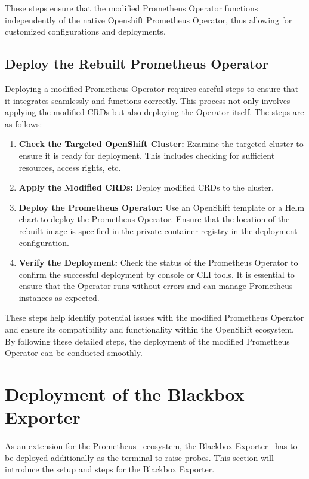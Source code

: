 These steps ensure that the modified Prometheus Operator functions independently of the native Openshift Prometheus Operator, thus allowing for customized configurations and deployments. 

\subsection{Deploy the Rebuilt Prometheus Operator}

Deploying a modified Prometheus Operator requires careful steps to ensure that it integrates seamlessly and functions correctly. This process not only involves applying the modified \ac{CRD}s but also deploying the Operator itself. The steps are as follows: 

\begin{enumerate}
    \item \textbf{Check the Targeted OpenShift Cluster:} Examine the targeted cluster to ensure it is ready for deployment. This includes checking for sufficient resources, access rights, etc. 
    \item \textbf{Apply the Modified CRDs:} Deploy modified CRDs to the cluster. 
    \item \textbf{Deploy the Prometheus Operator:} Use an OpenShift template or a Helm chart to deploy the Prometheus Operator. Ensure that the location of the rebuilt image is specified in the private container registry in the deployment configuration. 
    \item \textbf{Verify the Deployment:} Check the status of the Prometheus Operator to confirm the successful deployment by console or \ac{CLI} tools. It is essential to ensure that the Operator runs without errors and can manage Prometheus instances as expected. 
\end{enumerate}

These steps help identify potential issues with the modified Prometheus Operator and ensure its compatibility and functionality within the OpenShift ecosystem. By following these detailed steps, the deployment of the modified Prometheus Operator can be conducted smoothly. 

\section{Deployment of the Blackbox Exporter}

As an extension for the Prometheus~\parencite{PrometheusMonitoringSystem} ecosystem, the Blackbox Exporter~\parencite{BlackboxExporter} has to be deployed additionally as the terminal to raise probes. This section will introduce the setup and steps for the Blackbox Exporter. 

